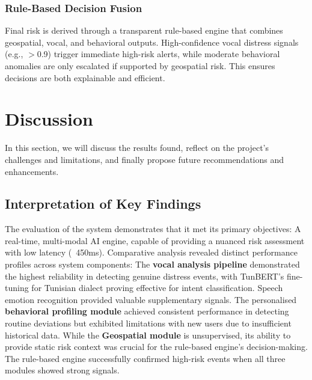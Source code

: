 \documentclass[12pt,a4paper,oneside,english]{book}
\begin{document}
{\subsubsection{Rule-Based Decision Fusion}
Final risk is derived through a transparent rule-based engine that combines geospatial, vocal, and behavioral outputs. High-confidence vocal distress signals (e.g., $>$0.9) trigger immediate high-risk alerts, while moderate behavioral anomalies are only escalated if supported by geospatial risk. This ensures decisions are both explainable and efficient.


\section{Discussion}
\label{sec:discussion}
In this section, we will discuss the results found, reflect on the project's challenges and limitations, and finally propose future recommendations and enhancements.

    \subsection{Interpretation of Key Findings}
    \label{subsec:interpretation}
    
The evaluation of the system demonstrates that it met its primary objectives: A real-time, multi-modal AI engine, capable of providing a nuanced risk assessment with low latency (~450ms). 
Comparative analysis revealed distinct performance profiles across system components: The \textbf{vocal analysis pipeline} demonstrated the highest reliability in detecting genuine distress events, with TunBERT's fine-tuning for Tunisian dialect proving effective for intent classification. Speech emotion recognition provided valuable supplementary signals. 
The personalised \textbf{behavioral profiling module} achieved consistent performance in detecting routine deviations but exhibited limitations with new users due to insufficient historical data.
While the \textbf{Geospatial module} is unsupervised, its ability to provide static risk context was crucial for the rule-based engine's decision-making.
The rule-based engine successfully confirmed high-risk events when all three modules showed strong signals.

}
\end{document}
